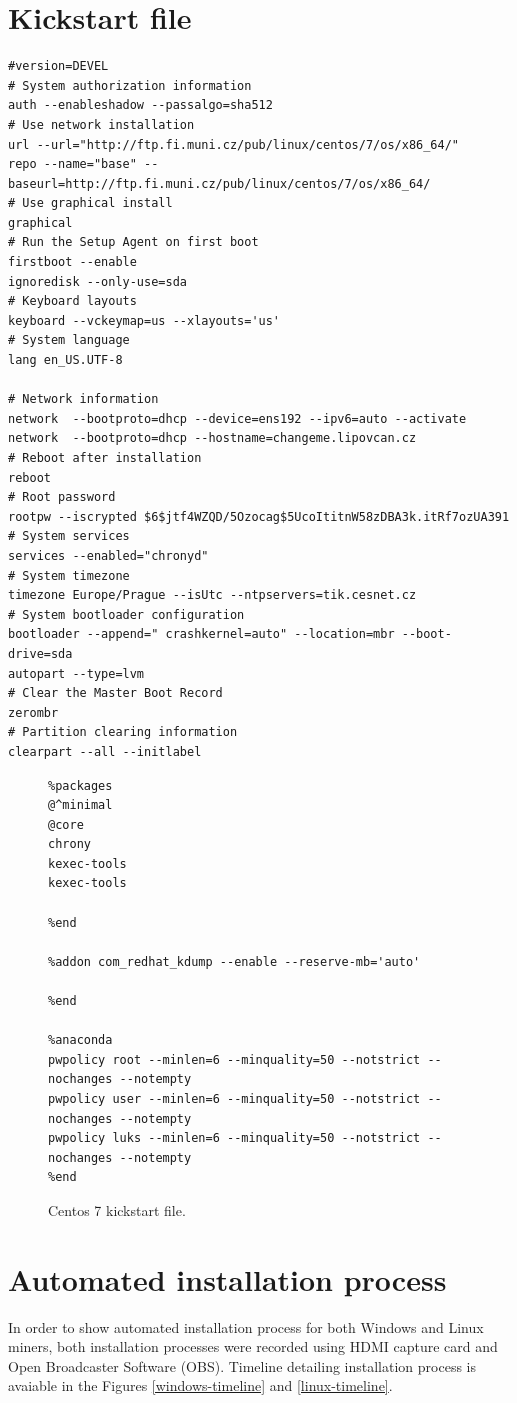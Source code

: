 \documentclass[
  printed, %
  table,   %
  lof,     %
  lot,     %
           oneside, color
]{fithesis3}
\begin{document}
\chapter{Kickstart file}
\label{kickstart}
\begin{lstlisting}
#version=DEVEL
# System authorization information
auth --enableshadow --passalgo=sha512
# Use network installation
url --url="http://ftp.fi.muni.cz/pub/linux/centos/7/os/x86_64/"
repo --name="base" --baseurl=http://ftp.fi.muni.cz/pub/linux/centos/7/os/x86_64/
# Use graphical install
graphical
# Run the Setup Agent on first boot
firstboot --enable
ignoredisk --only-use=sda
# Keyboard layouts
keyboard --vckeymap=us --xlayouts='us'
# System language
lang en_US.UTF-8

# Network information
network  --bootproto=dhcp --device=ens192 --ipv6=auto --activate
network  --bootproto=dhcp --hostname=changeme.lipovcan.cz
# Reboot after installation
reboot
# Root password
rootpw --iscrypted $6$jtf4WZQD/5Ozocag$5UcoItitnW58zDBA3k.itRf7ozUA391
# System services
services --enabled="chronyd"
# System timezone
timezone Europe/Prague --isUtc --ntpservers=tik.cesnet.cz
# System bootloader configuration
bootloader --append=" crashkernel=auto" --location=mbr --boot-drive=sda
autopart --type=lvm
# Clear the Master Boot Record
zerombr
# Partition clearing information
clearpart --all --initlabel
\end{lstlisting}
\newpage
\begin{figure}[H]
\begin{lstlisting}
%packages
@^minimal
@core
chrony
kexec-tools
kexec-tools

%end

%addon com_redhat_kdump --enable --reserve-mb='auto'

%end

%anaconda
pwpolicy root --minlen=6 --minquality=50 --notstrict --nochanges --notempty
pwpolicy user --minlen=6 --minquality=50 --notstrict --nochanges --notempty
pwpolicy luks --minlen=6 --minquality=50 --notstrict --nochanges --notempty
%end
\end{lstlisting}


\center
\caption{Centos 7 kickstart file.}
\label{fig:kickstart}
\end{figure}
\chapter{Automated installation process}
In order to show automated installation process for both Windows and Linux miners, both installation processes were recorded using HDMI capture card and Open Broadcaster Software (OBS). Timeline detailing installation process is avaiable in the Figures \ref{windows-timeline} and \ref{linux-timeline}.
\end{document}
